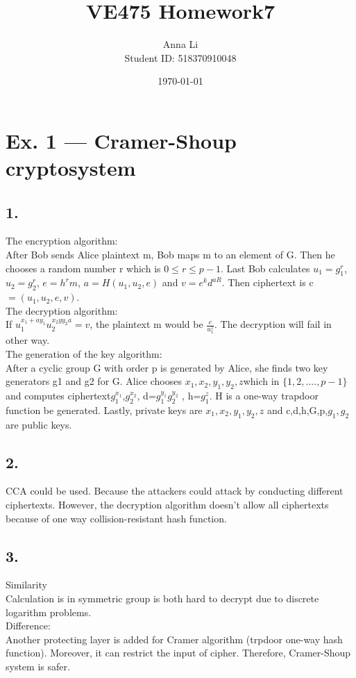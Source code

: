 \documentclass[a4paper,12pt]{journal}
\title{VE475 Homework7}
\author{Anna Li \\Student ID: 518370910048}
\date{\today}
\begin{document}
	\maketitle
\section*{Ex. 1 — Cramer-Shoup cryptosystem}
\subsection*{1.}
The encryption algorithm: \\
After Bob sends Alice plaintext m, Bob maps m to an element of G. Then he chooses a random number r which is $0\leq r\leq p-1$. Last Bob calculates $u_1=g_1^r$, $u_2=g_2^r$, $e=h^rm$, $a=H(u_1,u_2,e)$ and $v=e^kd^{aR}$. Then ciphertext is c$=(u_1,u_2,e,v)$.\\
The decryption algorithm: \\
If $u_1^{x_1+ay_1}u_2^{x_2yy_2a}=v$, the plaintext m would be $\frac{e}{u_1^{z}}$. The decryption will fail in other way.\\
The generation of the key algorithm: \\
After a cyclic group G with order p is generated by Alice, she finds two key generators g1 and g2 for G. Alice chooses $x_1,x_2,y_1,y_2,z$which in $\{1,2,....,p-1\}$ and computes ciphertext$g_1^{x_1}$,$g_2^{x_2}$, d=$g_1^{y_1}g_2^{y_2}$ , h=$g_1^{z}$. H is a one-way trapdoor function be generated. Lastly, private keys are $x_1,x_2,y_1,y_2,z$ and c,d,h,G,p,$g_1,g_2$ are public keys.\\ 
\subsection*{2.}
CCA could be used. Because the attackers could attack by conducting different ciphertexts. However, the decryption algorithm doesn't allow all ciphertexts because of one way collision-resistant hash function.
\subsection*{3.}
Similarity\\
 Calculation is in symmetric group is both hard to decrypt due to discrete logarithm problems.\\
Difference:\\
Another protecting layer is added for Cramer algorithm (trpdoor one-way hash function). Moreover, it can restrict the input of cipher. Therefore, Cramer-Shoup system is safer. \\
\end{document}
